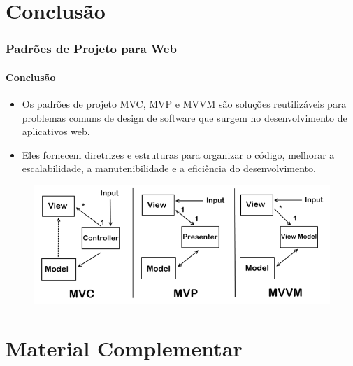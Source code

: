 \documentclass[
	9pt, %
	t, %
]{beamer}
\begin{document}
\section{Conclusão}

\begin{frame}
	\frametitle{Padrões de Projeto para Web}
	\framesubtitle{Conclusão}

	\begin{itemize}
		\item Os padrões de projeto MVC, MVP e MVVM são soluções reutilizáveis para problemas
		      comuns de design de software que surgem no desenvolvimento de aplicativos web.
		\item Eles fornecem diretrizes e estruturas para organizar o código, melhorar a
		      escalabilidade, a manutenibilidade e a eficiência do desenvolvimento.
	\end{itemize}

	\begin{figure}
		\centering
		\includegraphics[width=0.9\linewidth]{mvc_mvp_mvvm_dif.png}
	\end{figure}

\end{frame}

\section{Material Complementar}
\end{document}
